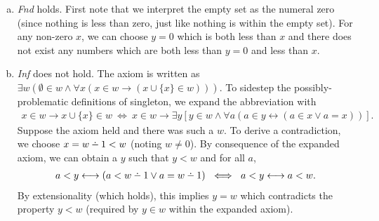 \documentclass[a4paper]{article}
\def\dotminus{\mathbin{\ooalign{\hss\raise1ex\hbox{.}\hss\cr
  \mathsurround=0pt$-$}}}
\begin{document}
\begin{enumerate}[a)]
  \item \textit{Fnd} holds.
    First note that we interpret the empty set as the numeral zero (since nothing is less than zero, just like nothing is within the empty set).
    For any non-zero $x$, we can choose $y = 0$ which is both less than $x$ and
    there does not exist any numbers which are both less than $y = 0$
    and less than $x$.
  \item \textit{Inf} does not hold. The axiom is written as
    $\exists w(\emptyset \in w \wedge \forall x(x \in w \longrightarrow (x \cup \{x\} \in w)))$.
    To sidestep the possibly-problematic definitions of singleton, we expand the abbreviation with
    \begin{align*}
      x \in w \longrightarrow x \cup \{x\} \in w 
      ~\iff~
      x \in w \longrightarrow\exists y\left[y \in w \wedge \forall a(a \in y \longleftrightarrow (a \in x \vee a = x))\right].
    \end{align*}
    Suppose the axiom held and there was such a $w$. To derive a contradiction,
    we choose $x = w \dotminus 1 < w$ (noting $w \ne 0$).
    By consequence of the expanded axiom, we can obtain a $y$
    such that $y < w$ and for all $a$,
    \begin{align*}
    a < y \longleftrightarrow (a < w \dotminus 1 \vee a = w \dotminus 1) 
    ~\iff~
    a < y \longleftrightarrow a < w.
    \end{align*}
    By extensionality (which holds), this implies $y = w$ which contradicts
    the property $y < w$ (required by $y \in w$ within the expanded axiom).
\end{enumerate}
\end{document}
